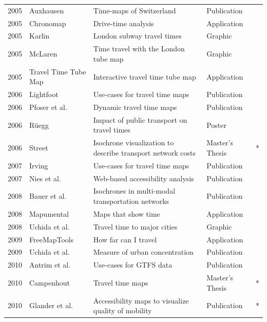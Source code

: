 \begin{table}[htb]
\begin{tabular}{r|l|l|l|c}
        2005 & Auxhausen \cite{axhausen2005zeitkarten} & Time-maps of Switzerland  & Publication  & \\
        2005 & Chronomap \cite{Chronomap} & Drive-time analysis  & Application  & \\
        2005 & Karlin \cite{Karlin2005}  & London subway travel times  & Graphic & \\
        2005 & McLaren \cite{McLaren2005} & Time travel with the London tube map  & Graphic  & \\
        2005 & Travel Time Tube Map \cite{Carden2006} & Interactive travel time tube map  & Application  & \\
        2006 & Lightfoot \cite{Lightfoot2006} & Use-cases for travel time maps  &  Publication  & \\
        2006 & Pfoser et al. \cite{pfoser2006dynamic} &  Dynamic travel time maps & Publication  & \\
        2006 & Rüegg \cite{Ruegg2006} & Impact of public transport on travel times  & Poster & \\
        2006 & Street \cite{street2006timecontours} & Isochrone visualization to describe transport network costs  & Master's Thesis  & * \\
        2007 & Irving \cite{Irving2007} & Use-cases for travel time maps  & Publication  & \\
        2007 & Nies et al. \cite{neis2007webbasierte} & Web-based accessibility analysis  & Publication  & \\
        2008 & Bauer et al. \cite{bauer2008computing} & Isochrones in multi-modal transportation networks  & Publication  & \\
        2008 & Mapumental \cite{Mapumental}  &  Maps that show time & Application  & \\
        2008 & Uchida et al. \cite{Uchida2008} & Travel time to major cities  & Graphic  & \\
        2009 & FreeMapTools \cite{Freemaptools} & How far can I travel  & Application  & \\
        2009 & Uchida et al. \cite{uchida2009agglomeration} & Measure of urban concentration  & Publication  & \\
        2010 & Antrim et al. \cite{antrim2013many} & Use-cases for GTFS data & Publication  & \\
        2010 & Campenhout \cite{van2010travel} & Travel time maps  & Master's Thesis  & * \\
        2010 & Glander et al. \cite{Glander2010} & Accessibility maps to visualize quality of mobility  &  Publication & * \\

\end{tabular}
\end{table}

